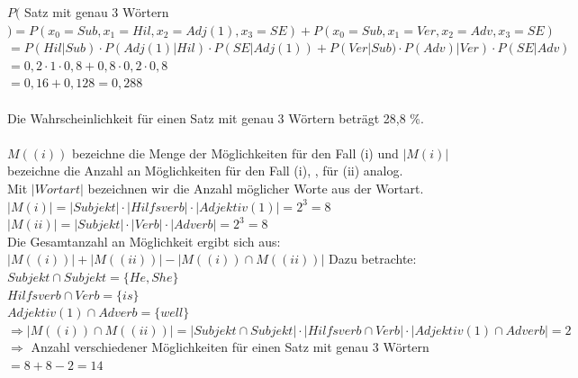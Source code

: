 \documentclass[a4paper]{article}
\begin{document}
$P($ Satz mit genau 3 W\"ortern $) = P(x_0 =Sub,x_1=Hil,x_2=Adj(1),x_3=SE)+P(x_0=Sub,x_1=Ver,x_2=Adv,x_3=SE)$ \\
$= P(Hil | Sub) \cdot P(Adj(1) | Hil) \cdot P(SE | Adj(1))+P(Ver | Sub) \cdot P(Adv) | Ver) \cdot P(SE | Adv)$ \\
$=0,2 \cdot 1 \cdot 0,8 + 0,8 \cdot 0,2 \cdot 0,8$ \\
$= 0,16 + 0,128 = 0,288$ \\
\\
Die Wahrscheinlichkeit f\"ur einen Satz mit genau 3 W\"ortern betr\"agt 28,8 \%. \\
\\
$M((i))$ bezeichne die Menge der M\"oglichkeiten f\"ur den Fall (i) und $| M(i)|$ bezeichne die Anzahl an M\"oglichkeiten f\"ur den Fall (i), , f\"ur (ii) analog.\\
Mit $| Wortart |$ bezeichnen wir die Anzahl m\"oglicher Worte aus der Wortart. \\
$|M(i)| = |Subjekt| \cdot |Hilfsverb| \cdot |Adjektiv(1)| = 2^3 = 8$ \\
$|M(ii)| = |Subjekt| \cdot |Verb| \cdot |Adverb| = 2^3 = 8$ \\
Die Gesamtanzahl an M\"oglichkeit ergibt sich aus: $|M((i))| + |M((ii))|- |M((i)) \cap M((ii))|$
Dazu betrachte: $Subjekt \cap Subjekt = \{ He, She \}$ \\
$Hilfsverb \cap Verb = \{is\}$ \\
$Adjektiv(1) \cap Adverb = \{well\}$ \\
$\Rightarrow |M((i)) \cap M((ii))| = |Subjekt \cap Subjekt| \cdot |Hilfsverb \cap Verb| \cdot |Adjektiv(1) \cap Adverb| = 2$ \\
$\Rightarrow$ Anzahl verschiedener M\"oglichkeiten f\"ur einen Satz mit genau 3 W\"ortern $= 8+8-2 = 14$
\end{document}
